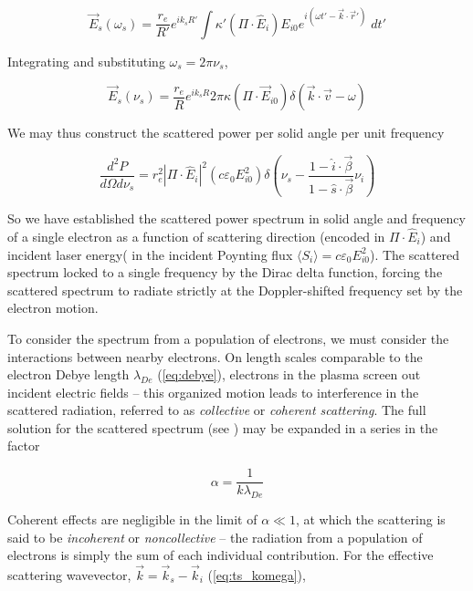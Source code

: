 \begin{equation}
 \vec{E}_s(\omega_s) = \frac{r_e}{R'} e^{ik_s R'} \int \kappa' \left( \Pi \cdot \hat{E}_i \right) E_{i0} e^{i(\omega t' - \vec{k} \cdot \vec{r}')} \;dt'
\end{equation}

\noindent Integrating and substituting $\omega_s = 2\pi \nu_s$,

\begin{equation}
 \vec{E}_s (\nu_s) = \frac{r_e}{R} e^{ik_s R} 2\pi \kappa \left(\Pi \cdot \vec{E}_{i0}\right) \delta(\vec{k}\cdot\vec{v} - \omega)
\end{equation}

\noindent We may thus construct the scattered power per solid angle per unit frequency

\begin{equation}\label{eq:ts_powerspectrumsingle}
 \frac{d^2 P}{d\Omega d\nu_s} = r_e^2 \left| \Pi \cdot \hat{E}_i \right|^2 \left( c \varepsilon_0 E_{i0}^2 \right) \delta \left( \nu_s - \frac{1 - \hat{i} \cdot \vec{\beta}}{1 - \hat{s} \cdot \vec{\beta}} \nu_i \right)
\end{equation}

\noindent So we have established the scattered power spectrum in solid angle and frequency of a single electron as a function of scattering direction (encoded in $\Pi \cdot \hat{E}_i$) and incident laser energy( in the incident Poynting flux $\langle S_i \rangle = c \varepsilon_0 E_{i0}^2$).  The scattered spectrum locked to a single frequency by the Dirac delta function, forcing the scattered spectrum to radiate strictly at the Doppler-shifted frequency set by the electron motion.

To consider the spectrum from a population of electrons, we must consider the interactions between nearby electrons.  On length scales comparable to the electron Debye length $\lambda_{De}$ (\cref{eq:debye}), electrons in the plasma screen out incident electric fields -- this organized motion leads to interference in the scattered radiation, referred to as \emph{collective} or \emph{coherent scattering}.  The full solution for the scattered spectrum (see \cite[\S 3]{Sheffield}) may be expanded in a series in the factor

\begin{equation}\label{eq:ts_alpha}
 \alpha = \frac{1}{k\lambda_{De}}
\end{equation}

\noindent Coherent effects are negligible in the limit of $\alpha \ll 1$, at which the scattering is said to be \emph{incoherent} or \emph{noncollective} -- the radiation from a population of electrons is simply the sum of each individual contribution.  For the effective scattering wavevector, $\vec{k} = \vec{k}_s - \vec{k}_i$ (\cref{eq:ts_komega}),

